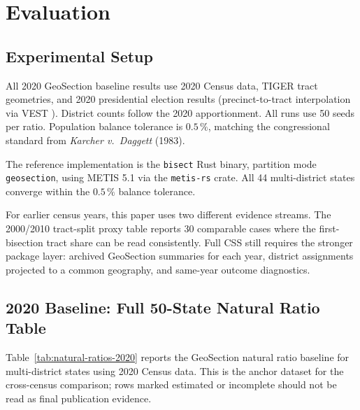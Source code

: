 \section{Evaluation}
\label{sec:evaluation}

\subsection{Experimental Setup}

All 2020 GeoSection baseline results use 2020 Census data, TIGER tract geometries,
and 2020 presidential election results (precinct-to-tract interpolation via
VEST \citep{fekrazad2021}).
District counts follow the 2020 apportionment.
All runs use 50 seeds per ratio.
Population balance tolerance is $0.5\,\%$, matching the congressional standard
from \emph{Karcher v.\ Daggett} (1983).

The reference implementation is the \texttt{bisect} Rust binary, partition
mode \texttt{geosection}, using METIS 5.1 via the \texttt{metis-rs} crate.
All 44 multi-district states converge within the $0.5\,\%$ balance tolerance.

For earlier census years, this paper uses two different evidence streams.
The 2000/2010 tract-split proxy table reports 30 comparable cases where the
first-bisection tract share can be read consistently.  Full CSS still requires
the stronger package layer: archived GeoSection summaries for each year,
district assignments projected to a common geography, and same-year outcome
diagnostics.

\subsection{2020 Baseline: Full 50-State Natural Ratio Table}
\label{sec:2020-baseline}

Table~\ref{tab:natural-ratios-2020} reports the GeoSection natural ratio
baseline for multi-district states using 2020 Census data.
This is the anchor dataset for the cross-census comparison; rows marked
estimated or incomplete should not be read as final publication evidence.

